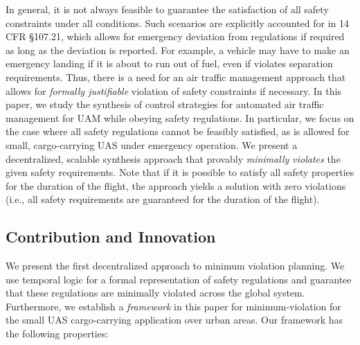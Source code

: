 In general, it is not always feasible to guarantee the satisfaction of all safety constraints under all conditions. Such scenarios are explicitly accounted for in 14 CFR \S 107.21, which allows for emergency deviation from regulations if required as long as the deviation is reported. For example, a vehicle may have to make an emergency landing if it is about to run out of fuel, even if violates separation requirements. Thus, there is a need for an air traffic management approach that allows for \emph{formally justifiable} violation of safety constraints if necessary. In this paper, we study the synthesis of control strategies for automated air traffic management for UAM while obeying safety regulations. In particular, we focus on the case where all safety regulations cannot be feasibly satisfied, as is allowed for small, cargo-carrying UAS under emergency operation. We present a decentralized, scalable synthesis approach that provably \emph{minimally violates} the given safety requirements.  Note that if it is possible to satisfy all safety properties for the duration of the flight, the approach yields a solution with zero violations (i.e., all safety requirements are guaranteed for the duration of the flight). %

\subsection{Contribution and Innovation}

We present the first decentralized approach to minimum violation planning. We use temporal logic for a formal representation of safety regulations and guarantee that these regulations are minimally violated across the global system. Furthermore, we establish a \emph{framework} in this paper for minimum-violation for the small UAS cargo-carrying application over urban areas. Our framework has the following properties:

